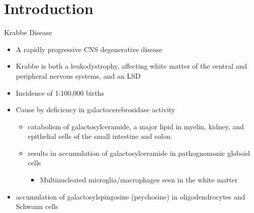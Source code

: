 \documentclass[presentation, smaller]{beamer}
\begin{document}
\section{Introduction}
\label{sec:org596897a}
\begin{frame}[label={sec:org84a3c88}]{Krabbe Disease}
\begin{itemize}
\item A rapidly progressive CNS degenerative disease
\item Krabbe is both a leukodystrophy, affecting white matter of the central
and peripheral nervous systems, and an LSD

\item Incidence of 1:100,000 births
\item Cause by deficiency in galactocerebrosidase activity
\begin{itemize}
\item catabolism of galactosylceramide, a major lipid in myelin, kidney, and epithelial cells of the small intestine and colon.
\item results in accumulation of galactosylceramide in pathognomonic globoid cells
\begin{itemize}
\item Multinucleated microglia/macrophages seen in the white matter
\end{itemize}
\end{itemize}
\item accumulation of galactosylspingosine (psychosine) in oligodendrocytes and Schwann cells
\end{itemize}
\end{frame}
\end{document}
